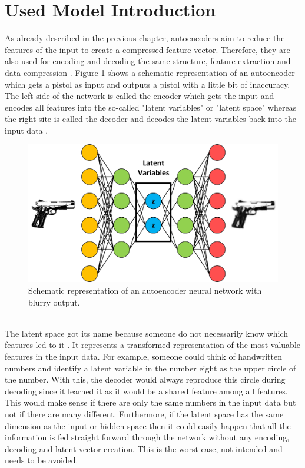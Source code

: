 \documentclass[MGS,Master,english]{twbook}%
\begin{document}
\section{Used Model Introduction}
As already described in the previous chapter, autoencoders aim to reduce the features of the input to create a compressed feature vector. Therefore, they are also used for encoding and decoding the same structure, feature extraction and data compression \cite{ml::book::nnProgrammingTF}. Figure \ref{fig::autoencoder} shows a schematic representation of an autoencoder which gets a pistol as input and outputs a pistol with a little bit of inaccuracy. The left side of the network is called the encoder which gets the input and encodes all features into the so-called "latent variables" or "latent space" whereas the right site is called the decoder and decodes the latent variables back into the input data \cite{ml::book::nnProgrammingTF}. 
\begin{figure}[!htbp]
	\centering
	\includegraphics[width=0.9\linewidth]{PICs/NNs/autoencoder}
	\caption{Schematic representation of an autoencoder neural network with blurry output.} \label{fig::autoencoder}
\end{figure}\\
The latent space got its name because someone do not necessarily know which features led to it \cite{ml::vae::tutorial}. It represents a transformed representation of the most valuable features in the input data. For example, someone could think of handwritten numbers and identify a latent variable in the number eight as the upper circle of the number. With this, the decoder would always reproduce this circle during decoding since it learned it as it would be a shared feature among all features. This would make sense if there are only the same numbers in the input data but not if there are many different. Furthermore, if the latent space has the same dimension as the input or hidden space then it could easily happen that all the information is fed straight forward through the network without any encoding, decoding and latent vector creation. This is the worst case, not intended and needs to be avoided.\\
\end{document}
